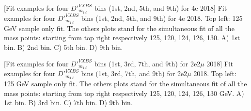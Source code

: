 \begin{multiFigure}
    \begin{center}
        [Fit examples for four $D'^{VXBS}_{m_{4\ell}}$ bins (1st, 2nd, 5th, and 9th) 
        for 4e 2018]
        {Fit examples for four $D'^{VXBS}_{m_{4\ell}}$ bins (1st, 2nd, 5th, and 9th) 
        for 4e 2018. Top left: 125 GeV sample only fit. The others plots stand for the simultaneous 
        fit of all the mass points: starting from top right respectively 125, 120, 124, 126, 130\GeV.
        \;A) 1st bin.
        \;B) 2nd bin.
        \;C) 5th bin.
        \;D) 9th bin. %
        }
    \label{signal_lineshape_2018_4e}
    \end{center}
\end{multiFigure}

\begin{multiFigure}
    \begin{center}
        [Fit examples for four $D'^{VXBS}_{m_{4\ell}}$ bins (1st, 3rd, 7th, and 9th) 
        for 2e2$\mu$ 2018]
        {Fit examples for four $D'^{VXBS}_{m_{4\ell}}$ bins (1st, 3rd, 7th, and 9th) 
        for 2e2$\mu$ 2018. Top left: 125 GeV sample only fit. The others plots stand for the simultaneous 
        fit of all the mass points: starting from top right respectively 125, 120, 124, 126, 130 GeV.
        \;A) 1st bin.
        \;B) 3rd bin.
        \;C) 7th bin.
        \;D) 9th bin. %
        }
        \label{signal_lineshape_2018_2e2mu}
    \end{center}
\end{multiFigure}


